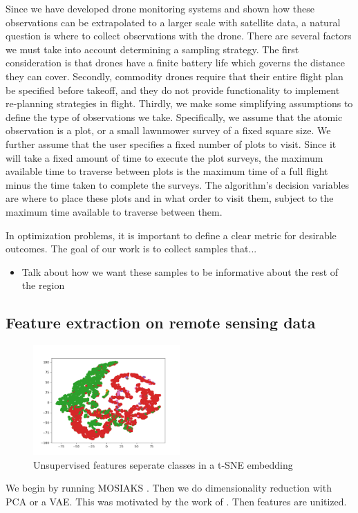 Since we have developed drone monitoring systems and shown how these observations can be extrapolated to a larger scale with satellite data, a natural question is where to collect observations with the drone. There are several factors we must take into account determining a sampling strategy. The first consideration is that drones have a finite battery life which governs the distance they can cover. Secondly, commodity drones require that their entire flight plan be specified before takeoff, and they do not provide functionality to implement re-planning strategies in flight. Thirdly, we make some simplifying assumptions to define the type of observations we take. Specifically, we assume that the atomic observation is a plot, or a small lawnmower survey of a fixed square size. We further assume that the user specifies a fixed number of plots to visit. Since it will take a fixed amount of time to execute the plot surveys, the maximum available time to traverse between plots is the maximum time of a full flight minus the time taken to complete the surveys. The algorithm's decision variables are where to place these plots and in what order to visit them, subject to the maximum time available to traverse between them.

In optimization problems, it is important to define a clear metric for desirable outcomes. The goal of our work is to collect samples that...
\begin{itemize}
    \item Talk about how we want these samples to be informative about the rest of the region 
\end{itemize}


\subsection{Feature extraction on remote sensing data}
\begin{figure}
    \centering
    \includegraphics[width=0.5\textwidth]{figs/methods/IPP/TSNE_features.png}
    \caption{Unsupervised features seperate classes in a t-SNE embedding}
    \label{fig:methods:ipp_feature_embedding}
\end{figure}
We begin by running MOSIAKS \cite{Rolf2021}. Then we do dimensionality reduction with PCA or a VAE. This was motivated by the work of \cite{Candela2020PlanetaryMapping}. Then features are unitized. 

